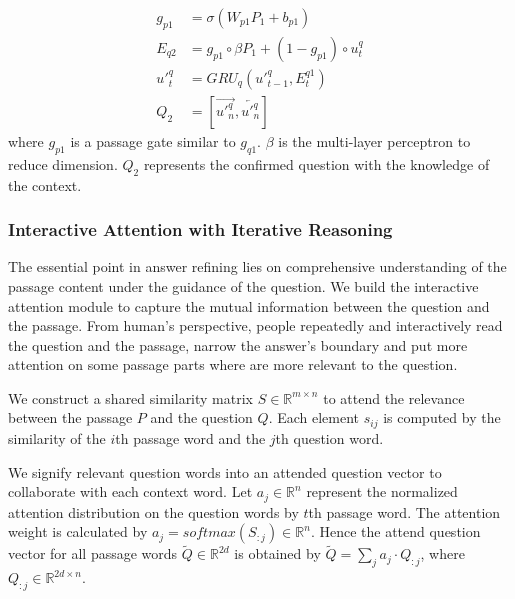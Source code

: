 \documentclass[letterpaper]{article} %
\begin{document}
\begin{align*}
g_{p1}&=\sigma(W_{p1}P_1+b_{p1})\\
E_{q2}&=g_{p1}\circ \beta P_1+(1-g_{p1}) \circ u_t^q \\
{u}'^q_t &= GRU_q({u}'^q_{t-1}, E_t^{q1}) \\
Q_2&= [ \overrightarrow{{u'}_n^q},\overleftarrow{{u'}_n^q}] \tag{6}
\end{align*}
 where $g_{p1}$ is a passage gate similar to $g_{q1}$. $\beta$ is the multi-layer perceptron to reduce dimension. $Q_2$ represents the confirmed question with the knowledge of the context.
 
 \subsubsection{Interactive Attention with Iterative Reasoning} 
 The essential point in answer refining lies on comprehensive understanding of the passage content under the guidance of the question. We build the interactive attention module to capture the mutual information between the question and the passage. From human's perspective, people repeatedly and interactively read the question and the passage, narrow the answer's boundary and put more attention on some passage parts where are more relevant to the question. 
 
 We construct a shared similarity matrix $S\in \mathbb{R}^{m\times n}$ to attend the relevance between the passage $P$ and the question $Q$. Each element $s_{ij}$ is computed by the similarity of the $i$th passage word and the $j$th question word. 

 We signify relevant question words into an attended question vector to collaborate with each context word. Let $a_j\in \mathbb{R}^n$ represent the normalized attention distribution on the question words by $t$th passage word. The attention weight is calculated by $a_j=softmax(S_{:j})\in \mathbb{R}^n$. Hence the attend question vector for all passage words $\widetilde{Q} \in \mathbb{R}^{2d}$ is obtained by $\widetilde{Q}=\sum_j a_j \cdot{Q_{:j}}$, where $Q_{:j} \in \mathbb{R}^{2d \times n}$.
\end{document}
